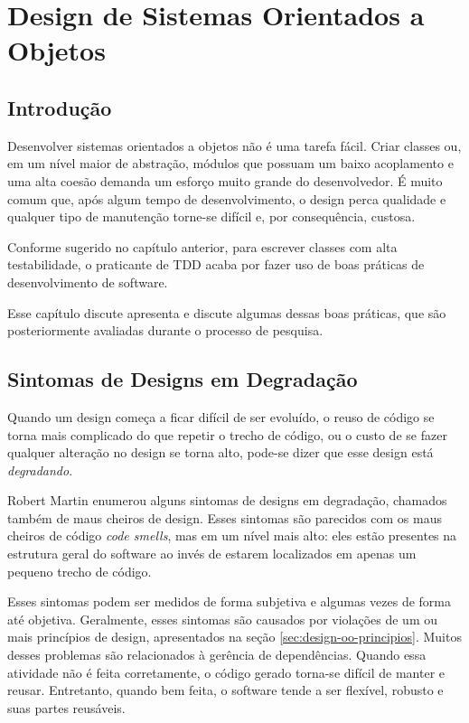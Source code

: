 \chapter{Design de Sistemas Orientados a Objetos}
\label{cap:design}

\section{Introdução}
\label{sec:design-introducao}

Desenvolver sistemas orientados a objetos não é uma tarefa fácil. Criar
classes ou, em um nível maior de abstração, módulos que possuam um baixo
acoplamento e uma alta coesão demanda um esforço muito grande do desenvolvedor. 
É muito comum que, após algum tempo de desenvolvimento, o design perca qualidade
e qualquer tipo de manutenção torne-se difícil e, por consequência, custosa.

Conforme sugerido no capítulo anterior, para escrever classes com alta
testabilidade, o praticante de TDD acaba por fazer uso de boas práticas de
desenvolvimento de software. 

Esse capítulo discute apresenta e discute algumas dessas boas práticas, que
são posteriormente avaliadas durante o processo de pesquisa.

\section{Sintomas de Designs em Degradação}
\label{sec:design-degradacao}

Quando um design começa a ficar difícil de ser evoluído, o reuso de código se 
torna mais complicado do que repetir o trecho de código, ou o custo de se fazer 
qualquer alteração no design se torna alto, pode-se dizer que esse design
está \textit{degradando}. 

Robert Martin \cite{bob-martin} enumerou alguns sintomas de designs em degradação, 
chamados também de maus cheiros de design. Esses sintomas são parecidos com os 
maus cheiros de código \textit{code smells}, mas em um nível mais alto: eles
estão presentes na estrutura geral do software ao invés de estarem localizados
em apenas um pequeno trecho de código.

Esses sintomas podem ser medidos de forma subjetiva e algumas vezes de forma 
até objetiva. Geralmente, esses sintomas são causados por violações de um ou 
mais princípios de design, apresentados na seção \ref{sec:design-oo-principios}.
Muitos desses problemas são relacionados à gerência de dependências. Quando essa
atividade não é feita corretamente, o código gerado torna-se difícil de manter e
reusar. Entretanto, quando bem feita, o software tende a ser flexível, robusto 
e suas partes reusáveis.


